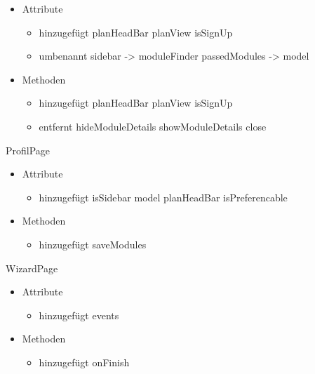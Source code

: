 	\begin{itemize}
		\item Attribute
		\begin{itemize}
			\item hinzugefügt
			\subitem planHeadBar
			\subitem planView
			\subitem isSignUp
			\item umbenannt
			\subitem sidebar -> moduleFinder
			\subitem passedModules -> model					
		\end{itemize}
		\item Methoden
		\begin{itemize}
			\item hinzugefügt
			\subitem planHeadBar
			\subitem planView
			\subitem isSignUp
			\item entfernt
			\subitem hideModuleDetails
			\subitem showModuleDetails
			\subitem close	
		\end{itemize}
	\end{itemize}
ProfilPage
	\begin{itemize}
		\item Attribute
		\begin{itemize}
			\item hinzugefügt
			\subitem isSidebar
			\subitem model
			\subitem planHeadBar
			\subitem isPreferencable	
		\end{itemize}
		\item Methoden
		\begin{itemize}
			\item hinzugefügt
			\subitem saveModules
		\end{itemize}
	\end{itemize}
WizardPage
	\begin{itemize}
		\item Attribute
		\begin{itemize}
			\item hinzugefügt
			\subitem events			
		\end{itemize}
		\item Methoden
		\begin{itemize}
			\item hinzugefügt
			\subitem onFinish
		\end{itemize}
	\end{itemize}

